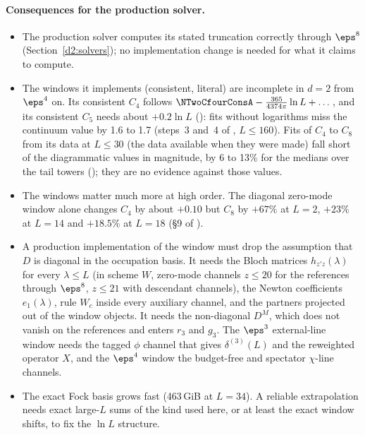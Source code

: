 \paragraph{Consequences for the production solver.}
\begin{itemize}
\item The production solver computes its stated truncation correctly through $\eps^8$ (Section~\ref{d2:solvers}); no
 implementation change is needed for what it claims to compute.
\item The windows it implements (consistent, literal) are incomplete in $d=2$ from $\eps^4$ on. Its consistent $C_4$ follows
 $\NTwoCfourConsA-\frac{365}{4374\pi}\ln L+\dots$, and its consistent $C_5$ needs about $+0.2\ln L$
 (): fits without logarithms miss the continuum value by 1.6 to 1.7 (steps~3
 and~4 of , $L\le160$). Fits of $C_4$ to $C_8$ from its data at $L\le30$ (the data available when they were made) fall short of the diagrammatic
 values in magnitude, by 6 to 13\% for the medians over the tail towers (); they are no
 evidence against those values.
\item The windows matter much more at high order. The diagonal zero-mode window alone changes $C_4$ by about $+0.10$ but $C_8$ by
 $+67\%$ at $L=2$, $+23\%$ at $L=14$ and $+18.5\%$ at $L=18$ (\S9 of ).
\item A production implementation of the window must drop the assumption that $D$ is diagonal in the occupation basis.
 It needs the Bloch matrices $h_{z'z}(\lambda)$ for every $\lambda\le L$ (in scheme $W$, zero-mode channels $z\le20$ for the references
 through $\eps^8$, $z\le21$ with descendant channels), the Newton coefficients $e_1(\lambda)$, rule $W_c$ inside every
 auxiliary channel, and the partners projected out of the window objects. It needs the non-diagonal $D^M$, which does not
 vanish on the references and enters $r_3$ and $g_3$. The $\eps^3$ external-line window needs the tagged $\phi$ channel that
 gives $\delta^{(3)}(L)$ and the reweighted operator $X$, and the $\eps^4$ window the budget-free and spectator $\chi$-line
 channels.
\item The exact Fock basis grows fast (463\,GiB at $L=34$). A reliable extrapolation needs exact large-$L$ sums of the kind
 used here, or at least the exact window shifts, to fix the $\ln L$ structure.
\end{itemize}
